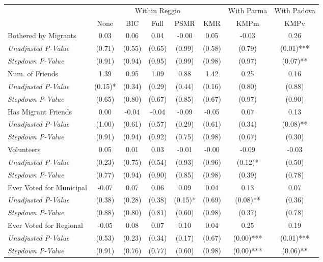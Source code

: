 \begin{tabular}{l c c c c c c c}
\toprule
& \multicolumn{5}{c}{Within Reggio} & With Parma & With Padova \\\cmidrule(lr){2-6} \cmidrule(lr){7-7} \cmidrule(lr){8-8}
 & None & BIC & Full & PSMR & KMR & KMPm & KMPv \\
\midrule
Bothered by Migrants & 0.03 & 0.06 & 0.04 & -0.00 & 0.05 & -0.03 & 0.26 \\
\quad \textit{Unadjusted P-Value} & (0.71) & (0.55) & (0.65) & (0.99) & (0.58) & (0.79) & (0.01)*** \\
\quad \textit{Stepdown P-Value} & (0.91) & (0.94) & (0.95) & (0.99) & (0.98) & (0.97) & (0.07)** \\
Num. of Friends & 1.39 & 0.95 & 1.09 & 0.88 & 1.42 & 0.25 & 0.16 \\
\quad \textit{Unadjusted P-Value} & (0.15)* & (0.34) & (0.29) & (0.44) & (0.16) & (0.80) & (0.88) \\
\quad \textit{Stepdown P-Value} & (0.65) & (0.80) & (0.67) & (0.85) & (0.67) & (0.97) & (0.90) \\
Has Migrant Friends & 0.00 & -0.04 & -0.04 & -0.09 & -0.05 & 0.07 & 0.13 \\
\quad \textit{Unadjusted P-Value} & (1.00) & (0.61) & (0.57) & (0.29) & (0.61) & (0.34) & (0.08)** \\
\quad \textit{Stepdown P-Value} & (0.91) & (0.94) & (0.92) & (0.75) & (0.98) & (0.67) & (0.30) \\
Volunteers & 0.05 & 0.01 & 0.03 & -0.01 & -0.00 & -0.09 & -0.03 \\
\quad \textit{Unadjusted P-Value} & (0.23) & (0.75) & (0.54) & (0.93) & (0.96) & (0.12)* & (0.50) \\
\quad \textit{Stepdown P-Value} & (0.77) & (0.94) & (0.90) & (0.85) & (0.98) & (0.39) & (0.78) \\
Ever Voted for Municipal & -0.07 & 0.07 & 0.06 & 0.09 & 0.04 & 0.13 & 0.07 \\
\quad \textit{Unadjusted P-Value} & (0.38) & (0.28) & (0.38) & (0.15)* & (0.69) & (0.08)** & (0.36) \\
\quad \textit{Stepdown P-Value} & (0.88) & (0.80) & (0.81) & (0.60) & (0.98) & (0.37) & (0.78) \\
Ever Voted for Regional & -0.05 & 0.08 & 0.07 & 0.10 & 0.04 & 0.25 & 0.19 \\
\quad \textit{Unadjusted P-Value} & (0.53) & (0.23) & (0.34) & (0.17) & (0.67) & (0.00)*** & (0.01)*** \\
\quad \textit{Stepdown P-Value} & (0.91) & (0.76) & (0.77) & (0.60) & (0.98) & (0.00)*** & (0.06)** \\
\bottomrule
\end{tabular}

